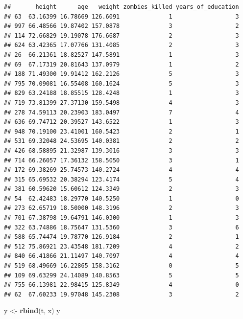 \documentclass[]{article}
\newenvironment{Shaded}{\begin{snugshade}}{\end{snugshade}}
\newcommand{\KeywordTok}[1]{\textcolor[rgb]{0.13,0.29,0.53}{\textbf{#1}}}
\newcommand{\StringTok}[1]{\textcolor[rgb]{0.31,0.60,0.02}{#1}}
\newcommand{\NormalTok}[1]{#1}
\begin{document}
\begin{verbatim}
##       height      age   weight zombies_killed years_of_education
## 63  63.16399 16.78669 126.6091              1                  3
## 997 66.48566 19.87402 157.0878              3                  2
## 114 72.66829 19.19078 176.6687              2                  3
## 624 63.42365 17.07766 131.4085              2                  3
## 26  66.21361 18.82527 147.5891              1                  3
## 69  67.17319 20.81643 137.0979              1                  2
## 188 71.49300 19.91412 162.2126              5                  3
## 795 70.09081 16.55408 160.1624              5                  3
## 829 63.24188 18.85515 128.4248              1                  3
## 719 73.81399 27.37130 159.5498              4                  3
## 278 74.59113 20.23903 183.0497              7                  4
## 636 69.74712 20.39527 143.6522              1                  3
## 948 70.19100 23.41001 160.5423              2                  1
## 531 69.32048 24.53695 140.0381              2                  2
## 426 68.58895 21.32987 139.3016              3                  3
## 714 66.26057 17.36132 158.5050              3                  1
## 172 69.38269 25.74573 140.2724              4                  4
## 315 65.69532 20.38294 123.4174              5                  4
## 381 60.59620 15.60612 124.3349              2                  3
## 54  62.42483 18.29770 140.5250              1                  0
## 273 62.65719 18.50000 148.3196              2                  3
## 701 67.38798 19.64791 146.0300              1                  3
## 322 63.74886 18.75647 131.5360              3                  6
## 588 65.74474 19.78770 126.9184              2                  1
## 512 75.86921 23.43548 181.7209              4                  2
## 840 66.41866 21.11497 140.7097              4                  4
## 519 68.49669 16.22865 158.3162              0                  5
## 109 69.63299 24.14089 140.8563              5                  5
## 755 66.13981 22.98415 125.8349              4                  0
## 62  67.60233 19.97048 145.2308              3                  2
\end{verbatim}

\begin{Shaded}
\begin{Highlighting}[]
\NormalTok{y <-}\StringTok{ }\KeywordTok{rbind}\NormalTok{(t, x)}
\NormalTok{y}
\end{Highlighting}
\end{Shaded}
\end{document}
